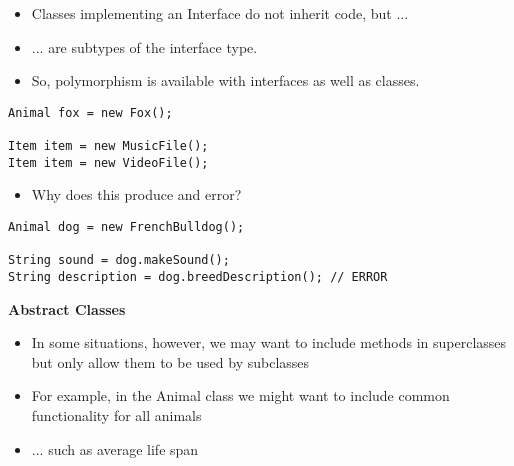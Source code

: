 \documentclass{beamer}
\begin{document}
\begin{frame}[fragile]
\begin{itemize}
\item Classes implementing an Interface do not inherit code, but ...
\item ... are subtypes of the interface type.
\item So, polymorphism is available with interfaces as well as classes.
\end{itemize}
\begin{block}{}
\begin{lstlisting}
Animal fox = new Fox();

Item item = new MusicFile();
Item item = new VideoFile();
\end{lstlisting}
\end{block}
\end{frame}

\begin{frame}[fragile]
\begin{itemize}
\item Why does this produce and error?
\end{itemize}
\begin{block}{}
\begin{lstlisting}
Animal dog = new FrenchBulldog();

String sound = dog.makeSound();
String description = dog.breedDescription(); // ERROR
\end{lstlisting}
\end{block}
\end{frame}

\begin{frame}
\begin{center}
\textbf{Abstract Classes}
\end{center}
\end{frame}

\begin{frame}
\begin{itemize}
\item In some situations, however, we may want to include methods in superclasses but only allow them to be used by subclasses
\item For example, in the Animal class we might want to include common functionality for all animals 
\item ... such as average life span
\end{itemize}
\end{frame}
\end{document}
